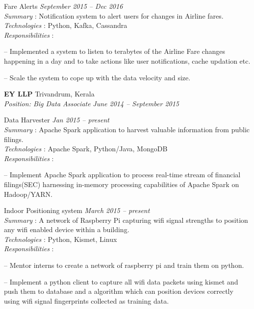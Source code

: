 \documentclass[margin,line]{resume}
\begin{document}
\begin{resume}
Fare Alerts				 \hfill  \textit{September 2015 -- Dec 2016} \\ 
\textit{Summary} : Notification system to alert users for changes in Airline fares. \\
      \textit{Technologies} : Python, Kafka, Cassandra\\
      \textit{Responsibilities} : 
     	 	\begin{list2}
\item[--] Implemented a system to listen to terabytes of the Airline Fare changes happening in a day and to take actions like user notifications, cache updation etc.
\item[--] Scale the system to cope up with the data velocity and size.

\end{list2}

    \textbf{EY LLP } 				\hfill  Trivandrum, Kerala \\
      \textit{Position: Big Data Associate } 			\hfill \textit{June 2014 -- September 2015}
  

Data Harvester				 				\hfill \textit{Jan 2015 -- present} \\ 
\textit{Summary} : Apache Spark application to harvest valuable information from public filings. \\
      \textit{Technologies} : Apache Spark, Python/Java, MongoDB\\
\textit{Responsibilities} : 
     	 	\begin{list2}
\item[--]Implement Apache Spark application to process real-time stream of financial filings(SEC) harnessing 
 in-memory processing capabilities of Apache Spark on Hadoop/YARN.
	\end{list2}

    Indoor Positioning system				 \hfill \textit{March 2015 -- present} \\
\textit{Summary} : A network of Raspberry Pi capturing wifi signal strengths to position any wifi enabled device within a building. 	 \\
      \textit{Technologies} : Python, Kismet, Linux\\
      \textit{Responsibilities} : 
     	 	\begin{list2}
\item[--] Mentor interns to create a network of raspberry pi and train them on python.
\item[--] Implement a python client to capture all wifi data packets using kismet and push them to database and a algorithm which can position devices correctly using wifi signal fingerprints collected as training data.
	\end{list2}
	

\end{resume}
\end{document}
